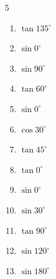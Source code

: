\begin{multicols}{5}
\begin{enumerate}

  \item $\displaystyle \tan{135^\circ}$

        \phantom{$\displaystyle =-1$}

\columnbreak %

  \item $\displaystyle \sin{0^\circ}$

        \phantom{$\displaystyle =0$}

  \item $\displaystyle \sin{90^\circ}$

        \phantom{$\displaystyle =1$}

  \item $\displaystyle \tan{60^\circ}$


  \item $\displaystyle \sin{0^\circ}$

        \phantom{$\displaystyle =0$}

  \item $\displaystyle \cos{30^\circ}$


  \item $\displaystyle \tan{45^\circ}$

        \phantom{$\displaystyle =1$}

  \item $\displaystyle \tan{0^\circ}$

        \phantom{$\displaystyle =0$}

  \item $\displaystyle \sin{0^\circ}$

        \phantom{$\displaystyle =0$}

  \item $\displaystyle \sin{30^\circ}$


  \item $\displaystyle \tan{90^\circ}$

        \phantom{$\displaystyle なし$}

  \item $\displaystyle \sin{120^\circ}$


  \item $\displaystyle \sin{180^\circ}$


\end{enumerate}
\end{multicols}
